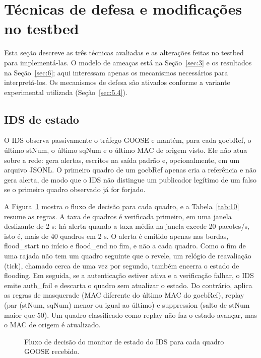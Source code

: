 \documentclass[12pt]{article}
\begin{document}
\section{Técnicas de defesa e modificações no testbed}\label{sec:5}

Esta seção descreve as três técnicas avaliadas e as alterações feitas no testbed para implementá-las. O modelo de ameaças está na Seção~\ref{sec:3} e os resultados na Seção~\ref{sec:6}; aqui interessam apenas os mecanismos necessários para interpretá-los. Os mecanismos de defesa são ativados conforme a variante experimental utilizada (Seção~\ref{sec:5.4}).

\subsection{IDS de estado}\label{sec:5.1}

O IDS observa passivamente o tráfego GOOSE e mantém, para cada gocbRef, o último stNum, o último sqNum e o último MAC de origem visto. Ele não atua sobre a rede: gera alertas, escritos na saída padrão e, opcionalmente, em um arquivo JSONL. O primeiro quadro de um gocbRef apenas cria a referência e não gera alerta, de modo que o IDS não distingue um publicador legítimo de um falso se o primeiro quadro observado já for forjado.

A Figura~\ref{fig:4} mostra o fluxo de decisão para cada quadro, e a Tabela~\ref{tab:10} resume as regras. A taxa de quadros é verificada primeiro, em uma janela deslizante de 2 s: há alerta quando a taxa média na janela excede 20 pacotes/s, isto é, mais de 40 quadros em 2 s. O alerta é emitido apenas nas bordas, flood\_\allowbreak{}start no início e flood\_\allowbreak{}end no fim, e não a cada quadro. Como o fim de uma rajada não tem um quadro seguinte que o revele, um relógio de reavaliação (tick), chamado cerca de uma vez por segundo, também encerra o estado de flooding. Em seguida, se a autenticação estiver ativa e a verificação falhar, o IDS emite auth\_\allowbreak{}fail e descarta o quadro sem atualizar o estado. Do contrário, aplica as regras de masquerade (MAC diferente do último MAC do gocbRef), replay (par (stNum, sqNum) menor ou igual ao último) e suppression (salto de stNum maior que 50). Um quadro classificado como replay não faz o estado avançar, mas o MAC de origem é atualizado.

\begin{figure}[!t]
\centering

\caption{Fluxo de decisão do monitor de estado do IDS para cada quadro GOOSE recebido.}\label{fig:4}
\end{figure}
\end{document}
